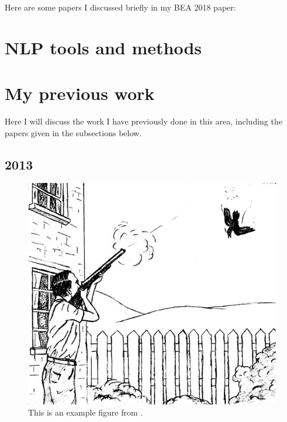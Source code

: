 Here are some papers I discussed briefly in my BEA 2018 paper:

\cite{leacock:ea:14}

\cite{kyle2015automatically}

\cite{weigle2013english}

\cite{amaral:meurers:user:07}

\cite{Meurers.Dickinson-17}

\cite{heift:schulze:07}

\cite{somasundaran:ea:15}

\cite{bailey:meurers:08}

\cite{meurers2011evaluating}

\cite{somasundaran:chodorow:14}

\cite{cahill-et-al:14}

\cite{ragheb:dickinson:14a}

\cite{foster2009native}

\cite{cho2013investigating}

\cite{landis1977measurement}

\cite{artstein:massimo:2008}

\cite{tetreault-chodorow:2008:HJCL}

\cite{tetreault:chodorow:08}

\section{NLP tools and methods}
\label{section:NLP}

\section{My previous work}
\label{section:myPreviousWork}
Here I will discuss the work I have previously done in this area, including the papers given in the subsections below.

\subsection{2013}
\cite{king:dickinson:13}

\begin{figure}
\includegraphics[width=.7\textwidth]{figures/exampleprompt2.jpg}
\caption{This is an example figure from \citet{king:dickinson:13}.}
\label{figure:KandD2013}
\end{figure}

